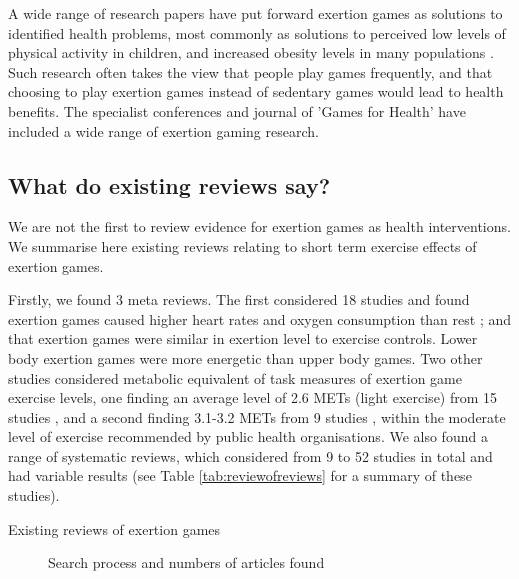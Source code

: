 A wide range of research papers have put forward exertion games as solutions to identified health problems, most commonly as solutions to perceived low levels of physical activity in children, and increased obesity levels in many populations \cite{marshall2017misrepresentation}. Such research often takes the view that people play games frequently, and that choosing to play exertion games instead of sedentary games would lead to health benefits. The specialist conferences and journal of 'Games for Health' have included a wide range of exertion gaming research.

\subsection{What do existing reviews say?}

We are not the first to review evidence for exertion games as health interventions. We summarise here existing reviews relating to short term exercise effects of exertion games. 

Firstly, we found 3 meta reviews. The first considered 18 studies and found exertion games caused higher heart rates and oxygen consumption than rest \cite{Peng_2011}; and that exertion games were similar in exertion level to exercise controls. Lower body exertion games were more energetic than upper body games. Two other studies considered metabolic equivalent of task measures of exertion game exercise levels, one finding an average level of 2.6 METs (light exercise) from 15 studies \cite{Dutta2015EffectsReview}, and a second finding 3.1-3.2 METs from 9 studies \cite{barnett2011active}, within the moderate level of exercise recommended by public health organisations. We also found a range of systematic reviews, which considered from 9 to 52 studies in total and had variable results (see  Table \ref{tab:reviewofreviews} for a summary of these studies).   

\begin{table}[]
    \caption{Existing reviews of exertion games}
    \label{tab:reviewofreviews}

\end{table}

\begin{figure}[]

\caption{Search process and numbers of articles found} \label{fig:flowchart}
\end{figure}




